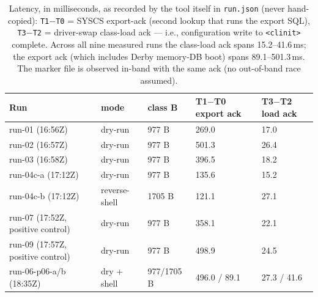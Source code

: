 \documentclass[journal]{IEEEtran}
\begin{document}
\begin{table}[t]
\centering
\caption{Latency, in milliseconds, as recorded by the tool itself in
\texttt{run.json} (never hand-copied): \texttt{T1$-$T0} = SYSCS export-ack
(second lookup that runs the export SQL), \texttt{T3$-$T2} = driver-swap
class-load ack — i.e., configuration write to \texttt{<clinit>} complete.
Across all nine measured runs the class-load ack spans 15.2--41.6\,ms; the
export ack (which includes Derby memory-DB boot) spans 89.1--501.3\,ms. The
marker file is observed in-band with the same ack (no out-of-band race assumed).}
\label{tab:latency}
\footnotesize
\begin{tabular}{p{}p{}p{}p{}p{}}
\toprule
Run & mode & class B & T1$-$T0 ex\-port ack & T3$-$T2 load ack \\
\midrule
run-01 (16:56Z) & dry-run & 977 B & 269.0 & 17.0 \\
run-02 (16:57Z) & dry-run & 977 B & 501.3 & 26.4 \\
run-03 (16:58Z) & dry-run & 977 B & 396.5 & 18.2 \\
run-04c-a (17:12Z) & dry-run & 977 B & 135.6 & 15.2 \\
run-04c-b (17:12Z) & reverse-shell & 1705 B & 121.1 & 27.1 \\
run-07 (17:52Z, positive control) & dry-run & 977 B & 358.1 & 22.1 \\
run-09 (17:57Z, positive control) & dry-run & 977 B & 498.9 & 24.5 \\
run-06-p06-a/b (18:35Z) & dry + shell & 977/1705 B & 496.0 / 89.1 & 27.3 / 41.6 \\
\bottomrule
\end{tabular}
\end{table}
\end{document}
